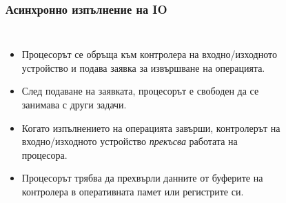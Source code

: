 \documentclass[ignorenonframetext, hyperref=unicode]{beamer}
\begin{document}
\begin{frame}
\frametitle{Асинхронно изпълнение на IO}
\begin{columns}
\begin{itemize}
\item Процесорът се обръща към контролера на входно/изходното устройство и
подава заявка за извършване на операцията.
\item След подаване на заявката, процесорът е свободен да се занимава с други
задачи.
\item Когато изпълнението на операцията завърши, контролерът на входно/изходното
устройство {\em прекъсва} работата на процесора.
\item Процесорът трябва да прехвърли данните от буферите на контролера в
оперативната памет или регистрите си.
\end{itemize}
\begin{figure}[h]
\center
{}
\end{figure}
\end{columns}
\end{frame}
\end{document}
